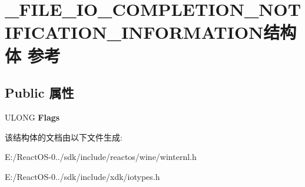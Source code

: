 \hypertarget{struct___f_i_l_e___i_o___c_o_m_p_l_e_t_i_o_n___n_o_t_i_f_i_c_a_t_i_o_n___i_n_f_o_r_m_a_t_i_o_n}{}\section{\+\_\+\+F\+I\+L\+E\+\_\+\+I\+O\+\_\+\+C\+O\+M\+P\+L\+E\+T\+I\+O\+N\+\_\+\+N\+O\+T\+I\+F\+I\+C\+A\+T\+I\+O\+N\+\_\+\+I\+N\+F\+O\+R\+M\+A\+T\+I\+O\+N结构体 参考}
\label{struct___f_i_l_e___i_o___c_o_m_p_l_e_t_i_o_n___n_o_t_i_f_i_c_a_t_i_o_n___i_n_f_o_r_m_a_t_i_o_n}
\subsection*{Public 属性}
\begin{DoxyCompactItemize}
\item 
\mbox{\label{struct___f_i_l_e___i_o___c_o_m_p_l_e_t_i_o_n___n_o_t_i_f_i_c_a_t_i_o_n___i_n_f_o_r_m_a_t_i_o_n_a0cf24e324a7264d53601c96f25951162}} 
U\+L\+O\+NG {\bfseries Flags}
\end{DoxyCompactItemize}


该结构体的文档由以下文件生成\+:\begin{DoxyCompactItemize}
\item 
E\+:/\+React\+O\+S-\/0../sdk/include/reactos/wine/winternl.\+h\item 
E\+:/\+React\+O\+S-\/0../sdk/include/xdk/iotypes.\+h\end{DoxyCompactItemize}
